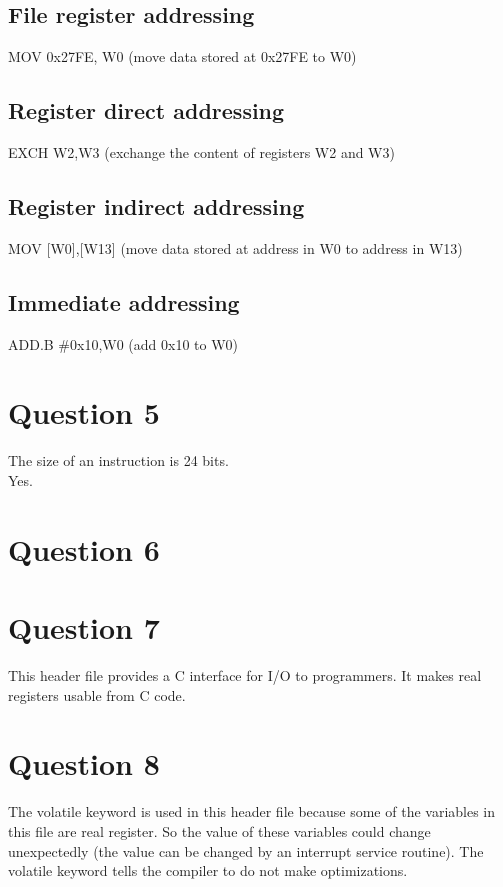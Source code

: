 \documentclass[a4paper,10pt]{article}
\begin{document}
\subsection*{File register addressing}
MOV 0x27FE, W0 (move data stored at 0x27FE to W0)
\subsection*{Register direct addressing}
EXCH W2,W3 (exchange the content of registers W2 and W3)
\subsection*{Register indirect addressing}
MOV [W0],[W13] (move data stored at address in W0 to address in W13)
\subsection*{Immediate addressing}
ADD.B $\#$0x10,W0 (add 0x10 to W0)

\section*{Question 5}
The size of an instruction is 24 bits.\\
Yes.

\section*{Question 6}

\section*{Question 7}
This header file provides a C interface for I/O to programmers. It makes real registers usable from C code.

\section*{Question 8}
The volatile keyword is used in this header file because some of the variables in this file are real register. So the value of these variables could change unexpectedly (the value can be changed by an interrupt service routine). The volatile keyword tells the compiler to do not make optimizations.
\end{document}

